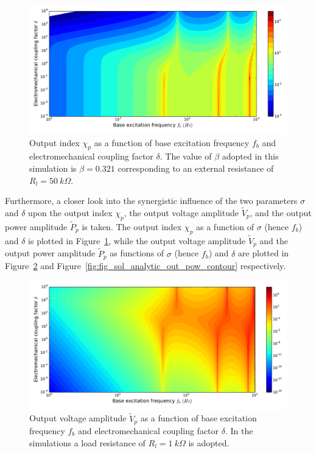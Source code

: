 \documentclass{article}
\begin{document}
\begin{figure}[!htbp]
    \centering
    \includegraphics[width=\textwidth]{./img_eig_asy/fig_sol_analytic_out_index_contour}
    \caption{Output index $\chi_p$ as a function of base excitation frequency $f_b$ and electromechanical coupling factor $\delta$. The value of $\beta$ adopted in this simulation is $\beta = 0.321$ corresponding to an external resistance of $R_l = 50\ k\Omega$. }
    \label{fig:fig_sol_analytic_out_index_contour}
\end{figure}

Furthermore, a closer look into the synergistic influence of the two parameters $\sigma$ and $\delta$ upon the output index $\chi_p$, the output voltage amplitude $\tilde{V}_p$, and the output power amplitude $\tilde{P}_p$ is taken. The output index $\chi_p$ as a function of $\sigma$ (hence $f_b$) and $\delta$ is plotted in Figure~\ref{fig:fig_sol_analytic_out_index_contour}, while the output voltage amplitude $\tilde{V}_p$ and the output power amplitude $\tilde{P}_p$ as functions of $\sigma$ (hence $f_b$) and $\delta$ are plotted in Figure~\ref{fig:fig_sol_analytic_out_vol_contour} and Figure~\ref{fig:fig_sol_analytic_out_pow_contour} respectively.

\begin{figure}[!htbp]
    \centering
    \includegraphics[width=\textwidth]{./img_eig_asy/fig_sol_analytic_out_vol_contour}
    \caption{Output voltage amplitude $\tilde{V}_p$ as a function of base excitation frequency $f_b$ and electromechanical coupling factor $\delta$. In the simulations a load resistance of $R_l = 1\ k\Omega$ is adopted.}
    \label{fig:fig_sol_analytic_out_vol_contour}
\end{figure}
\end{document}
